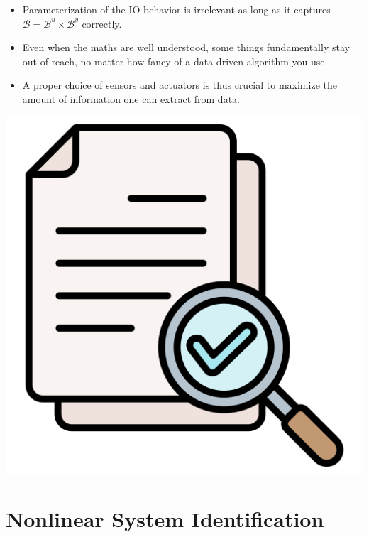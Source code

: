 \documentclass[aspectratio=169,compress,12pt,dvipsnames]{beamer}
\begin{document}
\begin{frame}
    \vfill
    \begin{minipage}{.68\textwidth}
        \begin{itemize}
            \item   Parameterization of the IO behavior is irrelevant as long as it captures $\mathcal{B} = \mathcal{B}^u \times \mathcal{B}^y$ correctly.
            \item   Even when the maths are well understood, some things fundamentally stay out of reach, no matter how fancy of a data-driven algorithm you use.
            \item   A proper choice of sensors and actuators is thus crucial to maximize the amount of information one can extract from data.
        \end{itemize}
    \end{minipage}%
    \hfill
    \begin{minipage}{.28\textwidth}
        \centering
        \includegraphics[width=\textwidth]{conclusion.png}
    \end{minipage}
    \vfill
\end{frame}

\section{Nonlinear System Identification}
\end{document}
